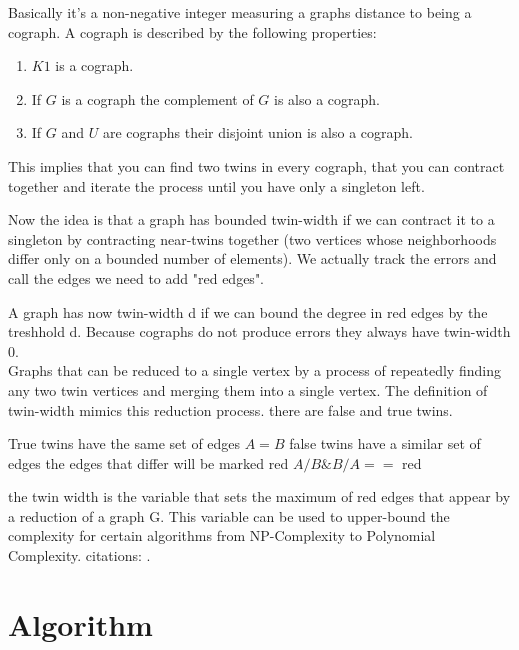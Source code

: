 \documentclass[10pt]{article}
\begin{document}
Basically it's a non-negative integer measuring a graphs distance to being a cograph. A
cograph is described by the following properties:

\begin{enumerate}
	\item $K1$ is a cograph.
	\item If $G$ is a cograph the complement of $G$ is also a cograph.
	\item If $G$ and $U$ are cographs their disjoint union is also a cograph.
\end{enumerate}

This implies that you can find two twins in every cograph, that you can contract together
and iterate the process until you have only a singleton left.

Now the idea is that a graph has bounded twin-width if we can contract it to a singleton
by contracting near-twins together (two vertices whose neighborhoods differ only on a
bounded number of elements). We actually track the errors and call the edges we need to
add "red edges".

A graph has now twin-width d if we can bound the degree in red edges by the treshhold d.
Because cographs do not produce errors they always have twin-width $0$. \\

Graphs that can be reduced to a single vertex by a process of repeatedly finding any two
twin vertices and merging them into a single vertex. The definition of twin-width mimics
this reduction process. there are false and true twins.

True twins have the same set of edges $A = B$ false twins have a similar set of edges the
edges that differ will be marked red ${A / B \& B/A} ==$ red

the twin width is the variable that sets the maximum of red edges that appear by a
reduction of a graph G. This variable can be used to upper-bound the complexity for
certain algorithms from NP-Complexity to Polynomial Complexity. citations:
\cite{bonnet2021twini} \cite{bonnet2021twinii}.

\section{Algorithm}
\end{document}
